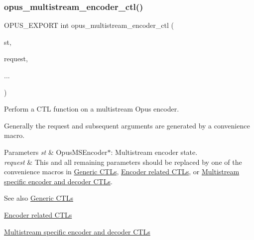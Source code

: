 \mbox{\label{group__opus__multistream_ga0f8756c84c7c62a38f99fb5cd6ed68af}} 
\subsubsection{\texorpdfstring{opus\+\_\+multistream\+\_\+encoder\+\_\+ctl()}{opus\_multistream\_encoder\_ctl()}}
{\footnotesize\ttfamily O\+P\+U\+S\+\_\+\+E\+X\+P\+O\+RT int opus\+\_\+multistream\+\_\+encoder\+\_\+ctl (\begin{DoxyParamCaption}\item[{\hyperlink{group__opus__multistream_gae5826674d142fc873ebc1d781c507dd7}{Opus\+M\+S\+Encoder} $\ast$}]{st,  }\item[{int}]{request,  }\item[{}]{... }\end{DoxyParamCaption})}

Perform a C\+TL function on a multistream Opus encoder.

Generally the request and subsequent arguments are generated by a convenience macro. 
\begin{DoxyParams}{Parameters}
{\em st} & {\ttfamily Opus\+M\+S\+Encoder$\ast$}\+: Multistream encoder state. \\
\hline
{\em request} & This and all remaining parameters should be replaced by one of the convenience macros in \hyperlink{group__opus__genericctls}{Generic C\+T\+Ls}, \hyperlink{group__opus__encoderctls}{Encoder related C\+T\+Ls}, or \hyperlink{group__opus__multistream__ctls}{Multistream specific encoder and decoder C\+T\+Ls}. \\
\hline
\end{DoxyParams}
\begin{DoxySeeAlso}{See also}
\hyperlink{group__opus__genericctls}{Generic C\+T\+Ls} 

\hyperlink{group__opus__encoderctls}{Encoder related C\+T\+Ls} 

\hyperlink{group__opus__multistream__ctls}{Multistream specific encoder and decoder C\+T\+Ls} 
\end{DoxySeeAlso}
\mbox{\label{group__opus__multistream_ga24b8a4ceb20a142069084cb1edd28a30}} 

